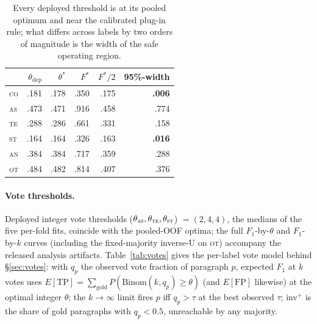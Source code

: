 \documentclass[11pt]{article}
\newcommand{\lab}[1]{\textsc{#1}}
\newcommand{\co}{\lab{co}}
\newcommand{\as}{\lab{as}}
\newcommand{\te}{\lab{te}}
\newcommand{\st}{\lab{st}}
\newcommand{\an}{\lab{an}}
\newcommand{\ot}{\lab{ot}}
\begin{document}
\begin{table}[h]
\centering\scriptsize
\setlength{\tabcolsep}{4pt}
\begin{tabular}{lrrrrr}
\toprule
 & $\theta_{\text{dep}}$ & $\theta^{*}$ & $F^{*}$ & $F^{*}/2$ & 95\%-width \\
\midrule
\co & .181 & .178 & .350 & .175 & \textbf{.006} \\
\as & .473 & .471 & .916 & .458 & .774 \\
\te & .288 & .286 & .661 & .331 & .158 \\
\st & .164 & .164 & .326 & .163 & \textbf{.016} \\
\an & .384 & .384 & .717 & .359 & .288 \\
\ot & .484 & .482 & .814 & .407 & .376 \\
\bottomrule
\end{tabular}
\caption{Every deployed threshold is at its pooled optimum and near the
calibrated plug-in rule; what differs across labels by two orders of
magnitude is the width of the safe operating region.}
\label{tab:lipton}
\end{table}

\paragraph{Vote thresholds.} Deployed integer vote thresholds
($\theta_{\as},\theta_{\te},\theta_{\st}$) $=(2,4,4)$, the medians of
the five per-fold fits, coincide with the pooled-OOF optima; the full $F_1$-by-$\theta$ and $F_1$-by-$k$ curves
(including the fixed-majority inverse-U on \ot) accompany the released
analysis artifacts. Table~\ref{tab:votes} gives the per-label vote model
behind \S\ref{sec:votes}: with $q_p$ the observed vote fraction of
paragraph $p$, expected $F_1$ at $k$ votes uses
$E[\mathrm{TP}]=\sum_{\text{gold}} P(\mathrm{Binom}(k,q_p)\geq\theta)$
(and $E[\mathrm{FP}]$ likewise) at the optimal integer $\theta$; the
$k{\to}\infty$ limit fires $p$ iff $q_p>\tau$ at the best observed
$\tau$; inv$^{+}$ is the share of gold paragraphs with $q_p<0.5$,
unreachable by any majority.
\end{document}
